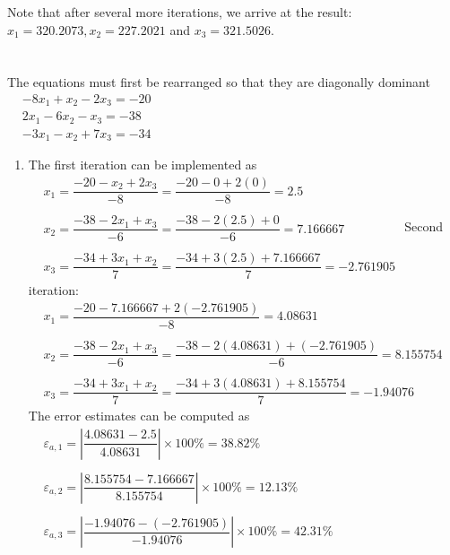 \documentclass[../main.tex]{subfiles}
\begin{document}
\begin{enumerate}[label=\bfseries(\alph*)]
\bigbreak
Note that after several more iterations, we arrive at the result: $x_{1}=320.2073, x_{2}=227.2021$ and $x_{3}=321.5026$.
\bigbreak
\end{enumerate}


\section{}

The equations must first be rearranged so that they are diagonally dominant
\bigbreak$
\begin{aligned}
&-8 x_{1}+x_{2}-2 x_{3}=-20 \\
&2 x_{1}-6 x_{2}-x_{3}=-38 \\
&-3 x_{1}-x_{2}+7 x_{3}=-34
\end{aligned}$
\bigbreak
\begin{enumerate}[label=\bfseries(\alph*)]
\item The first iteration can be implemented as
\bigbreak$
\begin{aligned}
&x_{1}=\dfrac{-20-x_{2}+2 x_{3}}{-8}=\dfrac{-20-0+2(0)}{-8}=2.5 \\\\
&x_{2}=\dfrac{-38-2 x_{1}+x_{3}}{-6}=\dfrac{-38-2(2.5)+0}{-6}=7.166667 \\\\
&x_{3}=\dfrac{-34+3 x_{1}+x_{2}}{7}=\dfrac{-34+3(2.5)+7.166667}{7}=-2.761905
\end{aligned}$
\bigbreak
Second iteration:
\bigbreak$
\begin{aligned}
&x_{1}=\dfrac{-20-7.166667+2(-2.761905)}{-8}=4.08631 \\\\
&x_{2}=\dfrac{-38-2 x_{1}+x_{3}}{-6}=\dfrac{-38-2(4.08631)+(-2.761905)}{-6}=8.155754 \\\\
&x_{3}=\dfrac{-34+3 x_{1}+x_{2}}{7}=\dfrac{-34+3(4.08631)+8.155754}{7}=-1.94076
\end{aligned}$
\bigbreak
The error estimates can be computed as
\bigbreak$
\begin{aligned}
&\varepsilon_{a, 1}=\left|\dfrac{4.08631-2.5}{4.08631}\right| \times 100 \%=38.82 \% \\\\
&\varepsilon_{a, 2}=\left|\dfrac{8.155754-7.166667}{8.155754}\right| \times 100 \%=12.13 \% \\\\
&\varepsilon_{a, 3}=\left|\dfrac{-1.94076-(-2.761905)}{-1.94076}\right| \times 100 \%=42.31 \%
\end{aligned}$

\end{enumerate}
\end{document}
